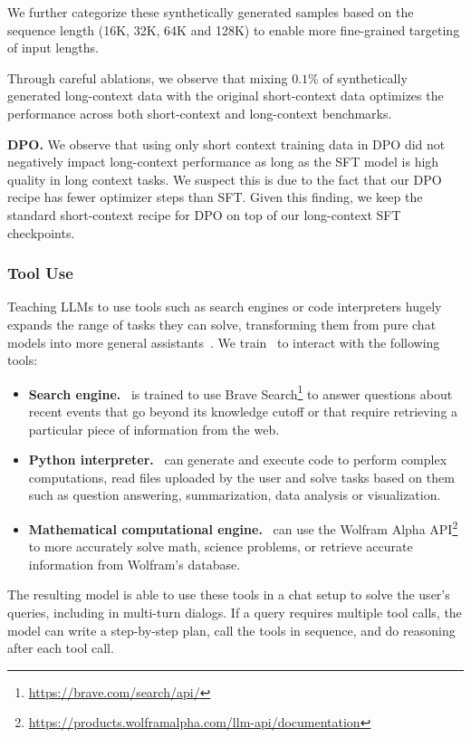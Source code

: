 \documentclass[dvipsnames]{fairmeta}
\begin{document}
We further categorize these synthetically generated samples based on the sequence length (16K, 32K, 64K and 128K) to enable more fine-grained targeting of input lengths.

Through careful ablations, we observe that mixing $0.1$\% of synthetically generated long-context data with the original short-context data optimizes the performance across both short-context and long-context benchmarks. 

\textbf{DPO.} 
We observe that using only short context training data in DPO did not negatively impact long-context performance as long as the SFT model is high quality in long context tasks. We suspect this is due to the fact that our DPO recipe has fewer optimizer steps than SFT.  Given this finding, we keep the standard short-context recipe for DPO on top of our long-context SFT checkpoints.

\subsubsection{Tool Use}
\label{subsubsec:tool_use}

Teaching LLMs to use tools such as search engines or code interpreters hugely expands the range of tasks they can solve, transforming them from pure chat models into more general assistants~\citep{nakano2021webgpt,thoppilan2022lamdalanguagemodelsdialog,parisi2022talm,gao2023pal,mialon2023augmented,schick2024toolformer}. We train \llamathree~to interact with the following tools:

\begin{itemize}
    \item \textbf{Search engine.} \llamathree~is trained to use Brave Search\footnote{\url{https://brave.com/search/api/}} to answer questions about recent events that go beyond its knowledge cutoff or that require retrieving a particular piece of information from the web.
    \item \textbf{Python interpreter.} \llamathree~can generate and execute code to perform complex computations, read files uploaded by the user and solve tasks based on them such as question answering, summarization, data analysis or visualization. 
    \item \textbf{Mathematical computational engine.} \llamathree~can use the Wolfram Alpha API\footnote{\url{https://products.wolframalpha.com/llm-api/documentation}} to more accurately solve math, science problems, or retrieve accurate information from Wolfram's database. 
\end{itemize}
The resulting model is able to use these tools in a chat setup to solve the user's queries, including in multi-turn dialogs. If a query requires multiple tool calls, the model can write a step-by-step plan, call the tools in sequence, and do reasoning after each tool call. 
\end{document}
